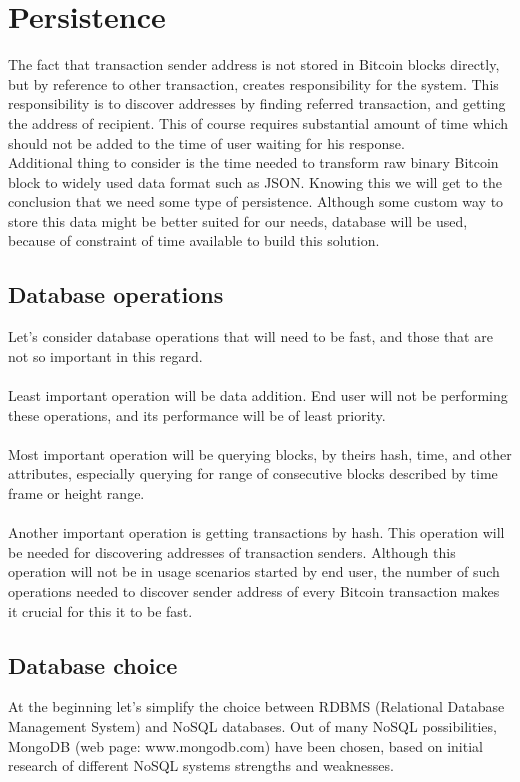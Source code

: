 \documentclass[12pt, en, eng, oneside]{mgr}
\begin{document}
\section{Persistence}
The fact that transaction sender address is not stored in Bitcoin blocks directly, but by reference to other transaction, creates responsibility for the system. This responsibility is to discover addresses by finding referred transaction, and getting the address of recipient. This of course requires substantial amount of time which should not be added to the time of user waiting for his response. 
\\
Additional thing to consider is the time needed to transform raw binary Bitcoin block to widely used data format such as JSON. Knowing this we will get to the conclusion that we need some type of persistence. Although some custom way to store this data might be better suited for our needs, database will be used, because of constraint of time available to build this solution.

\subsection{Database operations}
Let's consider database operations that will need to be fast, and those that are not so important in this regard.
\\
\\
Least important operation will be data addition. End user will not be performing these operations, and its performance will be of least priority.
\\
\\
Most important operation will be querying blocks, by theirs hash, time, and other attributes, especially querying for range of consecutive blocks described by time frame or height range.
\\
\\
Another important operation is getting transactions by hash. This operation will be needed for discovering addresses of transaction senders. Although this operation will not be in usage scenarios started by end user, the number of such operations needed to discover sender address of every Bitcoin transaction makes it crucial for this it to be fast.

\subsection{Database choice}
At the beginning let's simplify the choice between RDBMS (Relational Database Management System) and NoSQL databases. Out of many NoSQL possibilities, MongoDB (web page: www.mongodb.com) have been chosen, based on initial research of different NoSQL systems strengths and weaknesses.
\end{document}
